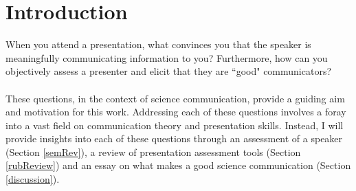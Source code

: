 \section{Introduction}

When you attend a presentation, what convinces you that the speaker is meaningfully communicating
information to you?
Furthermore, how can you objectively assess a presenter and elicit that they are ``good"
communicators?\\
\\
These questions, in the context of science communication, provide a guiding aim and motivation for
this work.
Addressing each of these questions involves a foray into a vast field on
communication theory and presentation skills.
Instead, I will provide insights into each of these questions through an assessment of a speaker
(Section \ref{semRev}), a review of presentation assessment tools (Section \ref{rubReview}) and an
essay on what makes a good science communication (Section \ref{discussion}).
